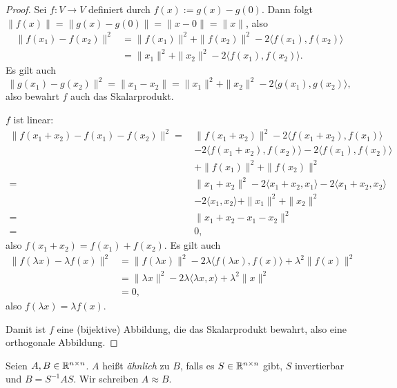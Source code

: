 \documentclass[
 a4paper,
 12pt,
 parskip=half
 ]{scrartcl}
\theoremstyle{plain}
\theoremstyle{definition}
\begin{document}
\begin{proof}
 Sei $f: V \to V$ definiert durch $f(x) := g(x) - g(0)$. Dann folgt $\| f(x) \| = \| g(x) - g(0) \| = \| x - 0 \| = \| x \|$, also
 \begin{align*}
\| f(x_1) - f(x_2) \|^2 
    &= \| f(x_1) \|^2 + \| f(x_2) \|^2 - 2 \langle f(x_1), f(x_2) \rangle \\
    &= \| x_1 \|^2 + \| x_2 \|^2 - 2 \langle f(x_1), f(x_2) \rangle.
 \end{align*}
 Es gilt auch
 \[ \| g(x_1) - g(x_2) \|^2 = \| x_1 - x_2 \| = \| x_1 \|^2 + \| x_2 \|^2 - 2 \langle g(x_1), g(x_2) \rangle, \]
 also bewahrt $f$ auch das Skalarprodukt.
 
 $f$ ist linear:
 \begin{align*} \| f(x_1 + x_2) - f(x_1) - f(x_2) \|^2 
    =\, &\| f(x_1 + x_2) \|^2 
      - 2 \langle f(x_1 + x_2), f(x_1) \rangle \\
    & - 2 \langle f(x_1 + x_2), f(x_2) \rangle
      - 2 \langle f(x_1 ), f(x_2) \rangle \\
    & + \| f(x_1) \|^2 + \| f(x_2) \|^2 \\
    =\, &\| x_1 + x_2 \|^2 
      - 2 \langle x_1 + x_2, x_1 \rangle
      - 2 \langle x_1 + x_2, x_2 \rangle \\
    & - 2 \langle x_1, x_2 \rangle
      + \| x_1 \|^2 + \| x_2 \|^2 \\
    =\, &\| x_1 + x_2 - x_1 - x_2 \|^2 \\
    =\, &0,
 \end{align*}
 also $f(x_1 + x_2) = f(x_1) + f(x_2)$. Es gilt auch
 \begin{align*} \| f(\lambda x) - \lambda f(x) \|^2 &= \| f( \lambda x ) \|^2 
      - 2 \lambda \langle f( \lambda x ), f( x ) \rangle 
      + \lambda^2 \| f(x) \|^2 \\
    &= \| \lambda x \|^2
      - 2 \lambda \langle \lambda x, x \rangle
      + \lambda^2 \| x \|^2 \\
    &= 0,
 \end{align*}
 also $f(\lambda x) = \lambda f(x)$.
 
 Damit ist $f$ eine (bijektive) Abbildung, die das Skalarprodukt bewahrt, also eine orthogonale Abbildung.
\end{proof}

\begin{mydef}[Ähnlichkeitsbegriff]
 Seien $A, B \in \mathbb{R}^{n \times n}$. $A$ heißt \emph{ähnlich} zu $B$, falls es $S \in \mathbb{R}^{n \times n}$ gibt, $S$ invertierbar und $B = S^{-1} A S$. Wir schreiben $A \approx B$.
\end{mydef}
\end{document}
